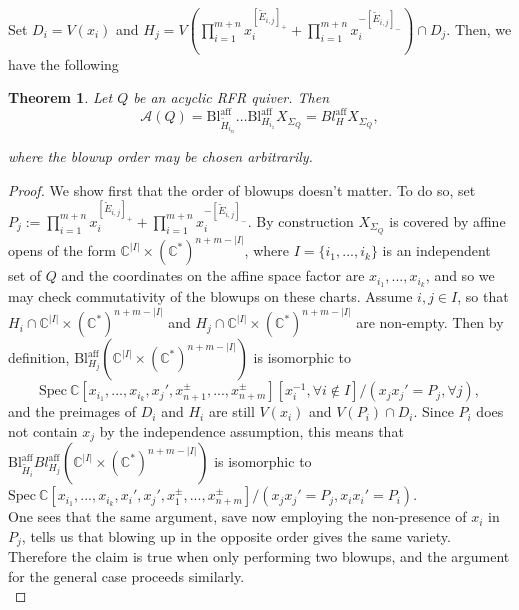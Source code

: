 \documentclass[11pt]{amsart}
\newtheorem{thm}{Theorem}[section]
\theoremstyle{definition}
\theoremstyle{remark}
\numberwithin{equation}{section}
\begin{document}
Set $D_i = V(x_i)$ and $H_j = V(\prod_{i=1}^{m+n} x_i^{[\tilde{E}_{i,j}]_+} + \prod_{i=1}^{m+n} x_i^{-[\tilde{E}_{i,j}]_-}) \cap D_j$. Then, we have the following

\begin{thm}
\label{blaff acyclic}
    Let $Q$ be an acyclic RFR quiver. Then $$\mathcal{A}(Q) = \text{Bl}_{\tilde{H}_{i_{n}}}^{\text{aff}}\dots \text{Bl}_{H_{i_1}}^{\text{aff}} X_{\Sigma_Q} = Bl_H^{\text{aff}} X_{\Sigma_Q},$$

    where the blowup order may be chosen arbitrarily.
\end{thm}

\begin{proof}
   We show first that the order of blowups doesn't matter. To do so, set $P_j := \prod_{i=1}^{m+n} x_i^{[\tilde{E}_{i,j}]_+} + \prod_{i=1}^{m+n} x_i^{-[\tilde{E}_{i,j}]_-}$. By construction $X_{\Sigma_Q}$ is covered by affine opens of the form $\mathbb{C}^{|I|} \times (\mathbb{C}^*)^{n + m - |I|}$, where $I = \{i_1, ..., i_k\}$ is an independent set of $Q$ and the coordinates on the affine space factor are $x_{i_1}, ..., x_{i_k}$, and so we may check commutativity of the blowups on these charts. Assume $i, j \in I$, so that $H_i \cap \mathbb{C}^{|I|} \times (\mathbb{C}^*)^{n + m - |I|}$ and $H_j \cap \mathbb{C}^{|I|} \times (\mathbb{C}^*)^{n + m - |I|}$ are non-empty. Then by definition, $\mathrm{Bl}_{H_j}^{\text{aff}} (\mathbb{C}^{|I|} \times (\mathbb{C}^*)^{n + m - |I|})$ is isomorphic to $$\text{Spec}\:\mathbb{C}[x_{i_1}, ..., x_{i_k}, x_j', x_{n+1}^\pm, ..., x_{n+m}^\pm][x_i^{-1}, \forall i \notin I]/(x_j x_j' = P_j, \forall j),$$ and the preimages of $D_i$ and $H_i$ are still $V(x_i)$ and $V(P_i) \cap D_i$. Since $P_i$ does not contain $x_j$ by the independence assumption, this means that $\mathrm{Bl}_{\tilde{H}_i}^{\text{aff}}Bl_{H_j}^{\text{aff}} (\mathbb{C}^{|I|} \times (\mathbb{C}^*)^{n + m - |I|})$ is isomorphic to
   $\text{Spec}\:\mathbb{C}[x_{i_1}, ..., x_{i_k}, x_i', x_j', x_1^\pm, ..., x_{n+m}^\pm]/(x_j x_j' = P_j, x_ix_i' = P_i)$.\\

   One sees that the same argument, save now employing the non-presence of $x_i$ in $P_j$, tells us that blowing up in the opposite order gives the same variety. Therefore the claim is true when only performing two blowups, and the argument for the general case proceeds similarly.\\


\end{proof}
\end{document}
